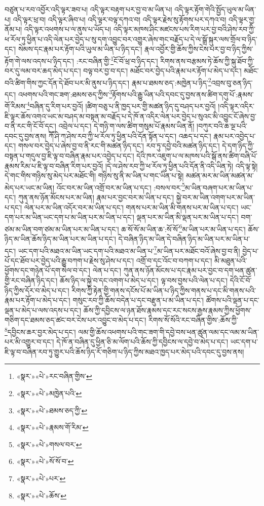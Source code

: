 བཙུན་པ་རབ་འབྱོར་འདི་ལྟར་ཟབ་པ། འདི་ལྟར་བརྟག་པར་བྱ་བ་མ་ཡིན་པ། འདི་ལྟར་རྟོག་གེའི་སྤྱོད་ཡུལ་མ་ཡིན་པ། འདི་ལྟར་ཕྲ་བ། འདི་ལྟར་ཞིབ་པ། འདི་ལྟར་བལྟ་དཀའ་བ། འདི་ལྟར་རྗེས་སུ་རྟོགས་པར་དཀའ་བ། འདི་ལྟར་གྱ་ནོམ་པ། འདི་ལྟར་འཕགས་པ་ལ་ནུས་པ་ཡོད་པ། འདི་ལྟར་མཁས་ཤིང་མཛངས་པས་རིག་པར་བྱ་བའི་ཤེས་རབ་ཀྱི་ཕ་རོལ་ཏུ་ཕྱིན་པ་འདི་ལེན་པར་བྱེད་པ་སུ་དག་འབྱུང་བར་འགྱུར་ཞེས་གང་བརྗོད་པ་དེ་ལ་སྒྲོ་སྐུར་ལས་གྲོལ་བ་ཉིད་དང་། སེམས་དང་རྣམ་པར་རྟོག་པའི་ཡུལ་མ་ཡིན་པ་ཉིད་དང་། རྣལ་འབྱོར་གྱི་ཆོས་ཀྱིས་ངེས་པར་བྱ་བ་ཉིད་ཀྱིས་རྟོག་གེ་ལས་འདས་པ་ཉིད་དང་། :རང་བཞིན་གྱི་\footnote{«སྣར་»«པེ་»རང་བཞིན་གྱིས་}ངོ་བོ་ཕྲ་བ་ཉིད་དང་། རིགས་ནས་བརྩམས་ཏེ་ཆོས་ཀྱི་སྐུ་ཐོབ་ཀྱི་བར་དུ་ལམ་བར་ཆད་མེད་པ་དང་། བལྟ་བར་བྱ་བ་དང་། མཐོང་བར་བྱེད་པའི་རྣམ་པར་རྟོག་པ་མེད་པ་དང་། མཐོང་བའི་ཚིག་གིས་ཀྱང་དོན་དེ་ཐོབ་པར་མི་ནུས་པ་ཉིད་དང་། རྣམ་པ་ཐམས་ཅད་:མཁྱེན་པ་ཉིད་\footnote{«སྣར་»«པེ་»མཁྱེན་པའི་}འབྲས་བུ་ཅན་ཉིད་དང་། འཕགས་པའི་གང་ཟག་:ཐམས་ཅད་ཀྱིས་\footnote{«སྣར་»«པེ་»ཐམས་ཅད་ཀྱི་}རྟོགས་པའི་རྒྱུ་ཡིན་པའི་དབང་དུ་བྱས་ནས་ཚིག་དགུ་པོ་:རྣམས་གོ་རིམས་\footnote{«སྣར་»«པེ་»རྣམས་གོ་རིམ་}བཞིན་དུ་རིག་པར་བྱའོ། །ཚིག་བཅུ་པ་ནི་ཁྱད་པར་གྱི་མཚན་ཉིད་དུ་བཤད་པར་བྱའོ། །འདི་ལྟར་འདིར་ཇི་ལྟར་ཆོས་འགའ་ཡང་མ་བཤད་མ་བསྟན་མ་བརྗོད་པ་དེ་ཁོ་ན་འདིར་ལེན་པར་བྱེད་པ་སུའང་མི་འབྱུང་ངོ་ཞེས་བྱ་བ་ནི་རང་གི་ངོ་བོ་དང་། འབྲེལ་པ་དང་། དེ་གཉི་ག་ལས་ཚིག་གསུམ་པོ་རྣམས་ཡིན་ནོ། །བཀུར་བའི་ཆ་ལྔ་པའི་དབང་དུ་བྱས་ནས། ཀཽ་ཤི་ཀ་ཤེས་རབ་ཀྱི་ཕ་རོལ་ཏུ་ཕྱིན་པའི་དོན་སྟོན་པ་དང་། འཆད་པ་དང་། རྣམ་པར་འབྱེད་པ་དང་། གསལ་བར་བྱེད་པ་ཞེས་བྱ་བ་ནི་རང་གི་མཚན་ཉིད་དང་། རབ་ཏུ་དབྱེ་བའི་མཚན་ཉིད་དང་། དེ་དག་ཉིད་ཀྱི་བསྟན་པ་གདུལ་བྱ་ཇི་ལྟ་བ་བཞིན་རྣམ་པར་འབྱེད་པ་དང་། དེའི་ཁར་འཇུག་པ་ལ་མཁས་པའི་སྒོ་ནས་ཚིག་བཞི་པོ་རྣམས་རིམ་པ་ཇི་ལྟ་བ་བཞིན་རིག་པར་བྱའོ། །དེ་ལ་ཤེས་རབ་ཀྱི་ཕ་རོལ་ཏུ་ཕྱིན་པའི་དོན་ནི་འདི་ཡིན་ཏེ། འདི་ལྟ་སྟེ། དེ་གང་གིས་གཉིས་སུ་མེད་པར་མཐོང་གི། གཉིས་སུ་ནི་མ་ཡིན་པ་གང་ཡིན་པ་སྟེ། མཚན་མར་མ་ཡིན་མཚན་མ་མེད་པར་ཡང་མ་ཡིན། འོང་བར་མ་ཡིན་འགྲོ་བར་མ་ཡིན་པ་དང་། :བསལ་བར་\footnote{«སྣར་»«པེ་»གསལ་བར་}མ་ཡིན་བཞག་པར་མ་ཡིན་པ་དང་། ཀུན་ནས་ཉོན་མོངས་པར་མ་ཡིན། རྣམ་པར་བྱང་བར་མ་ཡིན་པ་དང་། སྐྱེ་བར་མ་ཡིན་འགག་པར་མ་ཡིན་པ་དང་། ལེན་པར་མ་ཡིན་འདོར་བར་མ་ཡིན་པ་དང་། གནས་པར་མ་ཡིན་མི་གནས་པར་མ་ཡིན་པ་དང་། ཡང་དག་པར་མ་ཡིན་ཡང་དག་པ་མ་ཡིན་པར་མ་ཡིན་པ་དང་། ལྡན་པར་མ་ཡིན་མི་ལྡན་པར་མ་ཡིན་པ་དང་། བག་ཙམ་མ་ཡིན་བག་ཙམ་མ་ཡིན་པར་མ་ཡིན་པ་དང་། ཆ་སོ་སོ་མ་ཡིན་ཆ་:སོ་སོ་\footnote{«སྣར་»«པེ་»སོ་སོ་བ་}མ་ཡིན་པར་མ་ཡིན་པ་དང་། ཆོས་ཉིད་མ་ཡིན་ཆོས་ཉིད་མ་ཡིན་པར་མ་ཡིན་པ་དང་། དེ་བཞིན་ཉིད་མ་ཡིན་དེ་བཞིན་ཉིད་མ་ཡིན་པར་མ་ཡིན་པ་དང་། ཡང་དག་པའི་མཐའ་མ་ཡིན་ཡང་དག་པའི་མཐའ་མ་ཡིན་པ་\footnote{«སྣར་»«པེ་»པར་}མ་ཡིན་པར་མཐོང་བའོ་ཞེས་བྱ་བ་ནི། བྱེད་པ་པོ་དང་ཐོབ་པར་བྱེད་པའི་རྒྱུ་བཀག་པ་རྗེས་སུ་ཤེས་པ་དང་། འགྲོ་བ་དང་འོང་བ་བཀག་པ་དང་། མི་མཐུན་པའི་ཕྱོགས་དང་གཉེན་པོ་དག་སེལ་བ་དང་། ལེན་པ་དང་། ཀུན་ནས་ཉོན་མོངས་པ་དང་རྣམ་པར་བྱང་བ་དག་ཕན་ཚུན་གྱི་རང་བཞིན་ཉིད་དང་། ཆོས་ཉིད་ལ་སྐྱེ་བ་དང་འགག་པ་མེད་པ་དང་། ལྟ་བས་བྱས་པའི་ལེན་པ་དང་། དེའི་ངོ་བོ་ཉིད་ཀྱིས་དོར་བ་མེད་པ་དང་། རིགས་ཀྱི་རྟེན་གྱི་གནས་དངོས་པོ་མ་ཡིན་པ་ཉིད་ཀྱིས་གནས་པ་དང་མི་གནས་པའི་རྣམ་པར་རྟོག་པ་མེད་པ་དང་། གསུང་རབ་ཀྱི་ཆོས་བདེན་པ་དང་བརྫུན་པ་མ་ཡིན་པ་དང་། ཚོགས་པའི་ལྡན་པ་དང་ལྡན་པ་མེད་པ་ལས་འདས་པ་དང་། ཆོས་ཀྱི་དབྱིངས་ལ་ཉན་ཐོས་རྣམས་དང་རང་སངས་རྒྱས་རྣམས་ཀྱིས་ཕྱོགས་གཅིག་དང་ཐམས་ཅད་ཚང་བར་ངེས་པར་འབྱུང་བ་མེད་པ་དང་། རིགས་སོ་སོའི་རང་བཞིན་གྱིས་:ཆོས་ཀྱི་\footnote{«སྣར་»«པེ་»ཆོས་}དབྱིངས་ཆར་བྱར་མེད་པ་དང་། ལམ་གྱི་ཆོས་འཕགས་པའི་གང་ཟག་གི་དབྱེ་བས་ཕན་ཚུན་ལམ་དང་ལམ་མ་ཡིན་པར་མི་འགྱུར་བ་དང་། དེ་ཁོ་ན་བཞིན་དུ་ཕྱིན་ཅི་མ་ལོག་པའི་ཆོས་ཀྱི་དབྱིངས་ལ་དབྱེ་བ་མེད་པ་དང་། ཡང་དག་པ་ཇི་ལྟ་བ་བཞིན་རབ་ཏུ་གྱུར་པའི་ཆོས་ཉིད་རོ་གཅིག་པ་ཉིད་ཀྱིས་མཐའ་ཁྱད་པར་མེད་པའི་དབང་དུ་བྱས་ནས། 